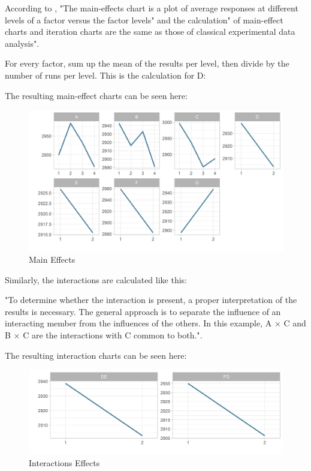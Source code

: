 According to \cite{yang_design_2009}, "The main-effects chart is a plot of average responses at different levels of a factor versus the factor levels" and the calculation" of main-effect charts and iteration charts are the same as those of classical experimental data analysis".

For every factor, sum up the mean of the results per level, then divide by the number of runs per level. This is the calculation for D:


The resulting main-effect charts can be seen here:
\begin{figure}[H] 
	\label{figure:taguchi:main_effects}
	\includegraphics[width=1\linewidth]{simulations/taguchi/plots/main_effects}
	\caption{Main Effects}
\end{figure}



Similarly, the interactions are calculated like this:


"To determine whether the interaction is present, a proper interpretation of the results is necessary. The general approach is to separate the influence of an interacting member from the influences of the others. In this example, A × C and B × C are the interactions with C common to both."\cite{roy_primer_1990}.



The resulting interaction charts can be seen here:
\begin{figure}[H] 
	\label{figure:taguchi:interaction_effects}
	\includegraphics[width=1\linewidth]{simulations/taguchi/plots/interaction_effects}
	\caption{Interactions Effects}
\end{figure}


